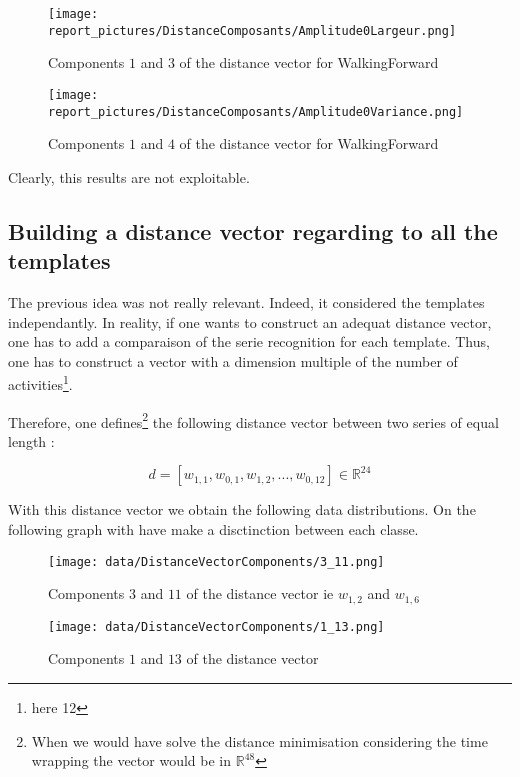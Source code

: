 \documentclass[a4,12pt]{article}
\newcommand{\R}{\mathbb{R}}
\begin{document}
	\begin{figure}[H]
		\centering
		\texttt{[image: report\_pictures/DistanceComposants/Amplitude0Largeur.png]}
		\caption{Components $1$ and $3$ of the distance vector for WalkingForward}
		\label{dist_components}
	\end{figure}
	
	\begin{figure}[H]
		\centering
		\texttt{[image: report\_pictures/DistanceComposants/Amplitude0Variance.png]}
		\caption{Components $1$ and $4$ of the distance vector for WalkingForward}
		\label{dist_components}
	\end{figure}
	
	Clearly, this results are not exploitable. 
	
	\subsection{Building a distance vector regarding to all the templates}
	
	The previous idea was not really relevant. Indeed, it considered the templates independantly. In reality, if one wants to construct an adequat distance vector, one has to add a comparaison of the serie recognition for each template. Thus, one has to construct a vector with a dimension multiple of the number of activities\footnote{here 12}.
	
	Therefore, one defines\footnote{When we would have solve the distance minimisation considering the time wrapping the vector would be in $\R^{48}$} the following distance vector between two series of equal length :
	
	\[ d=[w_{1,1}, w_{0,1}, w_{1,2}, ..., w_{0,12}] \in \R^{24} \]
	
	With this distance vector we obtain the following data distributions. On the following graph with have make a disctinction between each classe.
	
	\begin{figure}[H]
		\centering
		\texttt{[image: data/DistanceVectorComponents/3\_11.png]}
		\caption{Components $3$ and $11$ of the distance vector ie $w_{1,2}$ and $w_{1,6}$}
		\label{dist_components}
	\end{figure}
	
	\begin{figure}[H]
		\centering
		\texttt{[image: data/DistanceVectorComponents/1\_13.png]}
		\caption{Components $1$ and $13$ of the distance vector}
		\label{dist_components}
	\end{figure}
	
\end{document}
